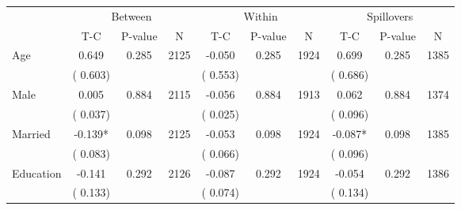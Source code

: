 
\begin{tabular}{l*{9}{c}}\hline&\multicolumn{3}{c}{Between}&\multicolumn{3}{c}{Within}&\multicolumn{3}{c}{Spillovers} \\ \cmidrule(r){2-4}\cmidrule(l){5-7}\cmidrule(l){8-10} & {T-C} & {P-value} & {N} & {T-C} & {P-value} & {N}  & {T-C} & {P-value} & {N}  \\ \midrule
 Age                 &              0.649          &        0.285 & 2125          &             -0.050          &        0.285 & 1924          &        0.699 &        0.285 & 1385                                 \\ 
                               &        (       0.603) & &                                                                 &       (       0.553) & &                                                          &       (       0.686)      & &                             \\ 
 Male                 &              0.005          &        0.884 & 2115          &             -0.056 &        0.884 & 1913                   &        0.062 &        0.884 & 1374                                 \\ 
                               &        (       0.037) & &                                                                 &       (       0.025) & &                                                          &       (       0.096) & &                                          \\ 
 Married                 &             -0.139*          &        0.098 & 2125          &             -0.053 &        0.098 & 1924                   &       -0.087* &        0.098 & 1385                                 \\ 
                               &        (       0.083) & &                                                                 &       (       0.066) & &                                                          &       (       0.096) & &                                          \\ 
 Education                 &             -0.141          &        0.292 & 2126          &             -0.087 &        0.292 & 1924                   &       -0.054 &        0.292 & 1386                                 \\ 
                               &        (       0.133) & &                                                                 &       (       0.074) & &                                                          &       (       0.134) & &                                          \\ 

\end{tabular}

